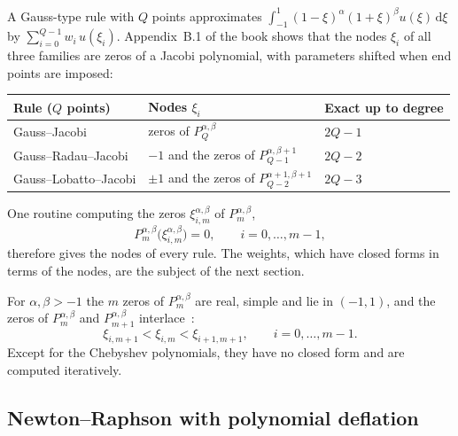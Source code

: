 \documentclass[11pt,a4paper]{article}
\newcommand{\Jac}[3]{P_{#1}^{#2,#3}}            %
\newcommand{\Pab}[1]{P_{#1}^{\alpha,\beta}}     %
\newcommand{\dd}{\mathrm{d}}
\begin{document}
A Gauss-type rule with $Q$ points approximates
$\int_{-1}^{1}(1-\xi)^\alpha(1+\xi)^\beta u(\xi)\,\dd\xi$ by
$\sum_{i=0}^{Q-1} w_i\,u(\xi_i)$. Appendix~B.1 of the book shows that the
nodes $\xi_i$ of all three families are zeros of a Jacobi polynomial, with
parameters shifted when end points are imposed:
\begin{center}
\begin{tabular}{@{}lll@{}}
\toprule
Rule ($Q$ points) & Nodes $\xi_i$ & Exact up to degree \\
\midrule
Gauss--Jacobi  & zeros of $\Pab{Q}$ & $2Q-1$ \\
Gauss--Radau--Jacobi & $-1$ and the zeros of $\Jac{Q-1}{\alpha}{\beta+1}$ & $2Q-2$ \\
Gauss--Lobatto--Jacobi & $\pm1$ and the zeros of $\Jac{Q-2}{\alpha+1}{\beta+1}$ & $2Q-3$ \\
\bottomrule
\end{tabular}
\end{center}
One routine computing the zeros $\xi^{\alpha,\beta}_{i,m}$ of $\Pab{m}$,
\begin{equation*}
  \Pab{m}\bigl(\xi^{\alpha,\beta}_{i,m}\bigr) = 0, \qquad i = 0,\dots,m-1,
\end{equation*}
therefore gives the nodes of every rule. The weights, which have closed forms
in terms of the nodes, are the subject of the next section.

For $\alpha,\beta>-1$ the $m$ zeros of $\Pab{m}$ are real, simple and lie in
$(-1,1)$, and the zeros of $\Pab{m}$ and $\Pab{m+1}$ interlace~\cite{Szego1939}:
\begin{equation*}
  \xi_{i,m+1} < \xi_{i,m} < \xi_{i+1,m+1}, \qquad i = 0,\dots,m-1.
\end{equation*}
Except for the Chebyshev polynomials, they have no closed form and are computed
iteratively.

\subsection{Newton--Raphson with polynomial deflation}
\end{document}
